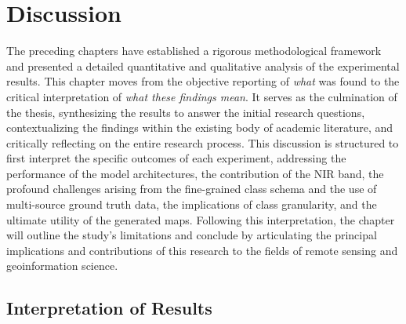 \documentclass{report}
\begin{document}
\section{Discussion}
The preceding chapters have established a rigorous methodological framework and presented a detailed quantitative and qualitative analysis of the experimental results. This chapter moves from the objective reporting of \textit{what} was found to the critical interpretation of \textit{what these findings mean}. It serves as the culmination of the thesis, synthesizing the results to answer the initial research questions, contextualizing the findings within the existing body of academic literature, and critically reflecting on the entire research process.
This discussion is structured to first interpret the specific outcomes of each experiment, addressing the performance of the model architectures, the contribution of the NIR band, the profound challenges arising from the fine-grained class schema and the use of multi-source ground truth data, the implications of class granularity, and the ultimate utility of the generated maps. Following this interpretation, the chapter will outline the study's limitations and conclude by articulating the principal implications and contributions of this research to the fields of remote sensing and geoinformation science.
\subsection{Interpretation of Results}
\end{document}
